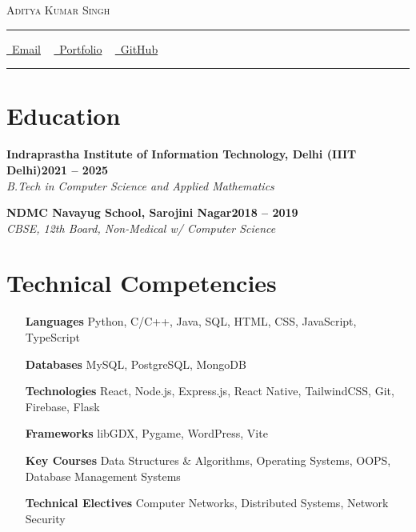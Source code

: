 \documentclass[letterpaper,10pt]{article}
\newcommand{\documentTitle}[2]{
  \begin{center}
    {\LARGE\scshape\color{accentTitle} #1}
    \vspace{5pt}
    {\color{accentLine} \hrule}
    \vspace{2pt}
    \footnotesize{#2}
    \vspace{2pt}
    {\color{accentLine} \hrule}
  \end{center}
}
\newcommand{\heading}[2]{
  \hspace{10pt}#1\hfill#2\\
}
\newcommand{\headingBf}[2]{
  \heading{\textbf{#1}}{\textbf{#2}}
}
\newcommand{\headingIt}[2]{
  \heading{\textit{#1}}{\textit{#2}}
}
\begin{document}

  \documentTitle{Aditya Kumar Singh}{
    \href{mailto:aditya21229@iiitd.ac.in}{
      \raisebox{-0.15\height} \faEnvelope\ Email} ~
    \href{https://bytewiseaditya.netlify.app/}{
      \raisebox{-0.15\height} \faGlobe\ Portfolio} ~
    \href{https://github.com/FreakAditya/}{
      \raisebox{-0.15\height} \faGithub\ GitHub}
  }


  \section{Education}

    \headingBf{Indraprastha Institute of Information Technology, Delhi (IIIT Delhi)}{2021 -- 2025}
    \headingIt{B.Tech in Computer Science and Applied Mathematics}{}

    \vspace{5pt}
    \headingBf{NDMC Navayug School, Sarojini Nagar}{2018 -- 2019}
    \headingIt{CBSE, 12th Board, Non-Medical w/ Computer Science}{}
  

  \section{Technical Competencies}

  \begin{multicols}{2}
    \begin{itemize}[itemsep=-2px, parsep=1pt, leftmargin=75pt]
      \item[\textbf{Languages}] Python, C/C++, Java, SQL, HTML, CSS, JavaScript, TypeScript
      \item[\textbf{Databases}] MySQL, PostgreSQL, MongoDB
      \item[\textbf{Technologies}] React, Node.js, Express.js, React Native, TailwindCSS, Git, Firebase, Flask
      \item[\textbf{Frameworks}] libGDX, Pygame, WordPress, Vite
      \item[\textbf{Key Courses}] Data Structures \& Algorithms, Operating Systems, OOPS, Database Management Systems
      \item[\textbf{Technical Electives}] Computer Networks, Distributed Systems, Network Security
    \end{itemize}
  \end{multicols}
\end{document}
